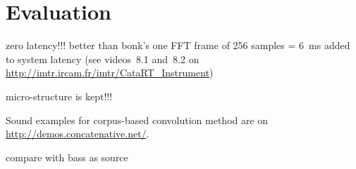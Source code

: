 \section{Evaluation}

zero latency!!! better than bonk's one FFT frame of 256 samples = 6~ms added to system latency
(see videos~8.1 and~8.2 on \url{http://imtr.ircam.fr/imtr/CataRT_Instrument})

micro-structure is kept!!!

Sound examples for corpus-based convolution method are on \url{http://demos.concatenative.net/}.

compare with bass as source
